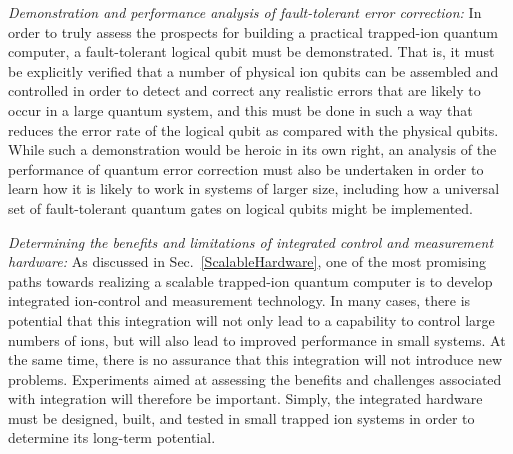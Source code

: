 \documentclass[%
reprint,
 amsmath,amssymb,
]{revtex4-1}
\begin{document}
\textit{Demonstration and performance analysis of fault-tolerant error correction:}  In order to truly assess the prospects for building a practical trapped-ion quantum computer, a fault-tolerant logical qubit must be demonstrated.  That is, it must be explicitly verified that a number of physical ion qubits can be assembled and controlled in order to detect and correct any realistic errors that are likely to occur in a large quantum system, and this must be done in such a way that reduces the error rate of the logical qubit as compared with the physical qubits.  While such a demonstration would be heroic in its own right, an analysis of the performance of quantum error correction must also be undertaken in order to learn how it is likely to work in systems of larger size, including how a universal set of fault-tolerant quantum gates on logical qubits might be implemented.

\textit{Determining the benefits and limitations of integrated control and measurement hardware:}  As discussed in Sec.~\ref{ScalableHardware}, one of the most promising paths towards realizing a scalable trapped-ion quantum computer is to develop integrated ion-control and measurement technology.  In many cases, there is potential that this integration will not only lead to a capability to control large numbers of ions, but will also lead to improved performance in small systems.  At the same time, there is no assurance that this integration will not introduce new problems.  Experiments aimed at assessing the benefits and challenges associated with integration will therefore be important.  Simply, the integrated hardware must be designed, built, and tested in small trapped ion systems in order to determine its long-term potential.
\end{document}

